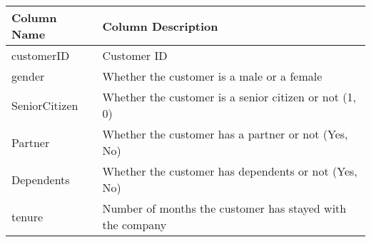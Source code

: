 \begin{longtable}[]{@{}ll@{}}
\toprule
\begin{minipage}[b]{0.52\columnwidth}\raggedright
Column Name\strut
\end{minipage} & \begin{minipage}[b]{0.43\columnwidth}\raggedright
Column Description\strut
\end{minipage}\tabularnewline
\midrule
\endhead
\begin{minipage}[t]{0.52\columnwidth}\raggedright
customerID\strut
\end{minipage} & \begin{minipage}[t]{0.43\columnwidth}\raggedright
Customer ID\strut
\end{minipage}\tabularnewline
\begin{minipage}[t]{0.52\columnwidth}\raggedright
gender\strut
\end{minipage} & \begin{minipage}[t]{0.43\columnwidth}\raggedright
Whether the customer is a male or a female\strut
\end{minipage}\tabularnewline
\begin{minipage}[t]{0.52\columnwidth}\raggedright
SeniorCitizen\strut
\end{minipage} & \begin{minipage}[t]{0.43\columnwidth}\raggedright
Whether the customer is a senior citizen or not (1, 0)\strut
\end{minipage}\tabularnewline
\begin{minipage}[t]{0.52\columnwidth}\raggedright
Partner\strut
\end{minipage} & \begin{minipage}[t]{0.43\columnwidth}\raggedright
Whether the customer has a partner or not (Yes, No)\strut
\end{minipage}\tabularnewline
\begin{minipage}[t]{0.52\columnwidth}\raggedright
Dependents\strut
\end{minipage} & \begin{minipage}[t]{0.43\columnwidth}\raggedright
Whether the customer has dependents or not (Yes, No)\strut
\end{minipage}\tabularnewline
\begin{minipage}[t]{0.52\columnwidth}\raggedright
tenure\strut
\end{minipage} & \begin{minipage}[t]{0.43\columnwidth}\raggedright
Number of months the customer has stayed with the company\strut

\end{minipage}
\end{longtable}
